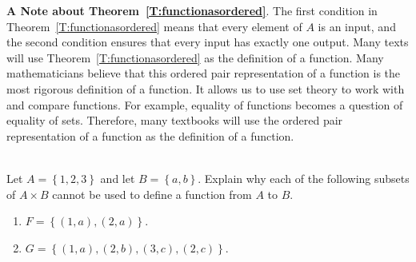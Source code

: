 %
\noindent
\textbf{A Note about Theorem~\ref{T:functionasordered}}.    
The first condition in Theorem~\ref{T:functionasordered} means that every element of  $A$  is an input, and the second condition ensures that every input has exactly one output.  Many texts will use Theorem~\ref{T:functionasordered} as the definition of a function.  Many mathematicians believe that this ordered pair representation of a function is the most rigorous definition of a function.  It allows us to use set theory to work with and compare functions.  For example, equality of functions becomes a question of equality of sets.  Therefore, many textbooks will use the ordered pair representation of a function as the definition of a function.
\hbreak
%
\begin{prog} \label{prog:ordered} \hfill \\
Let  $A = \left\{ {1, 2, 3} \right\}$  and let  $B = \left\{ {a, b} \right\}$.  Explain why each of the following subsets of $A \times B$ cannot be used to define a function from $A$ to $B$.
\begin{multicols}{2}
\begin{enumerate}
\item $F = \left\{ {( {1, a} ), ( {2, a} )} \right\}$.

\item $G = \left\{ {( {1, a} ), ( {2, b} ), ( {3, c} ), ( {2, c} )} \right\}$.
\end{enumerate}
\end{multicols}
\end{prog}
\hbreak
%

\endinput
